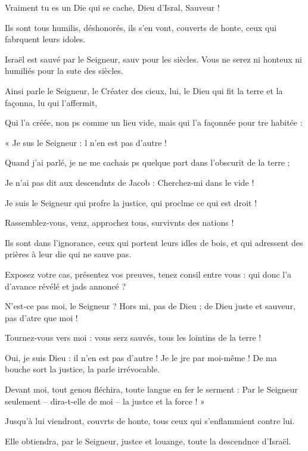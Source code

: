 \item Vraiment tu es un Die qui se cache,\psstar{} Dieu d’Isral, Sauveur !
\item Ils sont tous humilis, déshonorés,\psstar{} ils s’en vont, couverts de honte, ceux qui fabrquent leurs idoles.
\item Israël est sauvé par le Seigneur, sauv pour les siècles.\psstar{} Vous ne serez ni honteux ni humiliés pour la sute des siècles.
\item Ainsi parle le Seigneur, le Créater des cieux,\psstar{} lui, le Dieu qui fit la terre et la façonna, lu qui l’affermit,
\item Qui l’a créée, non ps comme un lieu vide,\psstar{} mais qui l’a façonnée pour tre habitée :
\item « Je sus le Seigneur :\psstar{} l n’en est pas d’autre !
\item Quand j’ai parlé, je ne me cachais ps quelque part\psstar{} dans l’obscurit de la terre ;
\item Je n’ai pas dit aux descendnts de Jacob :\psstar{} Cherchez-mi dans le vide !
\item Je suis le Seigneur qui profre la justice,\psstar{} qui proclme ce qui est droit !
\item Rassemblez-vous, venz, approchez tous,\psstar{} survivnts des nations !
\item Ils sont dans l’ignorance, ceux qui portent leurs idles de bois,\psstar{} et qui adressent des prières à leur die qui ne sauve pas.
\item Exposez votre cas, présentez vos preuves, tenez consil entre vous :\psstar{} qui donc l’a d’avance révélé et jads annoncé ?
\item N’est-ce pas moi, le Seigneur ? Hors mi, pas de Dieu ;\psstar{} de Dieu juste et sauveur, pas d’atre que moi !
\item Tournez-vous vers moi : vous serz sauvés,\psstar{} tous les lointins de la terre !
\item Oui, je suis Dieu : il n’en est pas d’autre !\pscross{} Je le jre par moi-même !\psstar{} De ma bouche sort la justice, la parle irrévocable. 
\item Devant moi, tout genou fléchira,\pscross{} toute langue en fer le serment :\psstar{} Par le Seigneur seulement – dira-t-elle de moi – la justce et la force ! »
\item Jusqu’à lui viendront, couvrts de honte,\psstar{} tous ceux qui s’enflammient contre lui. 
\item Elle obtiendra, par le Seigneur, justce et louange,\psstar{} toute la descendnce d’Israël.